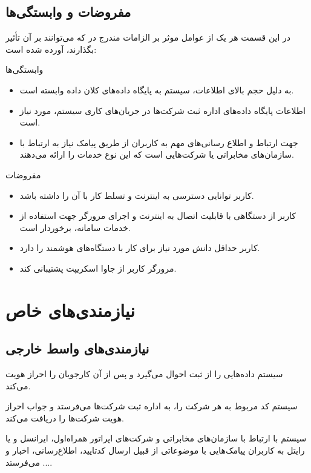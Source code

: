 \documentclass[12pt,svgnames,oneside]{book}
\newcounter{itemadded}
\let\LaTeXStandardEnumerateBegin\enumerate
\let\LaTeXStandardEnumerateEnd\endenumerate
\renewenvironment{enumerate}{%
\LaTeXStandardEnumerateBegin%
\setcounter{itemadded}{0}
}{%
\LaTeXStandardEnumerateEnd%
}%
\begin{document}
\subsection{مفروضات و وابستگی‌ها}
در این قسمت هر یک از عوامل موثر بر الزامات مندرج در  که می‌توانند بر آن تأثیر بگذارند، آورده شده است:

\begin{enumerate}
\item
وابستگی‌ها
\begin{itemize}
\item
به دلیل حجم بالای اطلاعات، سیستم به پایگاه داده‌های کلان داده وابسته است.
\item
اطلاعات پایگاه داده‌های اداره ثبت شرکت‌ها در جریان‌های کاری سیستم، مورد نیاز است.
\item
جهت ارتباط و اطلاع رسانی‌های مهم به کاربران از طریق پیامک نیاز به ارتباط با سازمان‌های مخابراتی یا شرکت‌هایی است که این نوع خدمات را ارائه می‌دهند.
\end{itemize}

\item
مفروضات
\begin{itemize}
\item
کاربر توانایی دسترسی به اینترنت و تسلط کار با آن را داشته باشد.
\item
کاربر از دستگاهی با قابلیت اتصال به اینترنت و اجرای مرورگر جهت استفاده از خدمات سامانه، برخوردار است.
\item
کاربر حداقل دانش مورد نیاز برای کار با دستگاه‌های هوشمند را دارد.
\item
مرورگر کاربر از جاوا اسکریپت پشتیبانی کند.
\end{itemize}
\end{enumerate}

\section{نیازمندی‌های خاص}

\subsection{نیازمندی‌های واسط خارجی}
\begin{enumerate}
\item
سیستم داده‌هایی را از ثبت احوال می‌گیرد و پس از آن کارجویان را  احراز هویت می‌کند.
\item
سیستم کد مربوط به هر شرکت را، به اداره ثبت شرکت‌ها می‌فرستد و جواب احراز هویت شرکت‌ها را دریافت می‌کند.
\item
سیستم با ارتباط با سازمان‌های مخابراتی و شرکت‌های اپراتور همراه‌اول، ایرانسل و یا رایتل به کاربران پیامک‌هایی با موضوعاتی از قبیل ارسال کدتایید، اطلاع‌رسانی، اخبار و ... می‌فرستد.
\end{enumerate}
\end{document}
